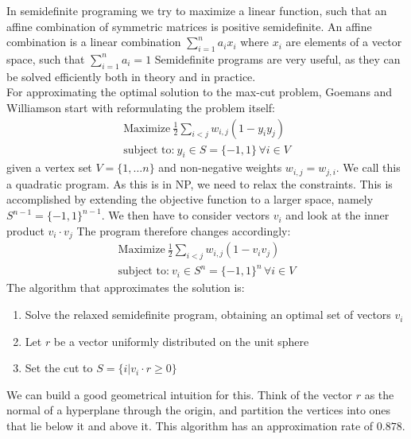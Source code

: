 In semidefinite programing we try to maximize a linear function, such that an affine combination of symmetric matrices is positive semidefinite. \cite{vandenberghe96}
An affine combination is a linear combination $\sum_{i=1}^{n}a_ix_i$
 where $x_i$ are elements of a vector space, such that $\sum_{i=1}^{n}a_i=1$
Semidefinite programs are very useful, as they can be solved efficiently both in theory and in practice.\\
For approximating the optimal solution to the max-cut problem, Goemans and Williamson \cite{goemans95} start with reformulating the problem itself: \begin{align*}
	\text{Maximize}\ \frac{1}{2}\sum_{i<j} w_{i,j}\left( 1-y_iy_j \right) \\
	\text{subject to:}\ y_i \in S=\{-1,1\}\, \forall i \in V
\end{align*}
given a vertex set $ V=\{1,\ldots n\} $ and non-negative weights $w_{i,j}=w_{j,i}$.
We call this a quadratic program.
As this is in NP, we need to relax the constraints.
This is accomplished by extending the objective function to a larger space, namely $S^{n-1}= \{-1,1\}^{n-1}$.
We then have to consider vectors $v_i$ and look at the inner product  $v_i\cdot v_j$
The program therefore changes accordingly:
 \begin{align*}
	\label{eq:}
	\text{Maximize}\ \frac{1}{2}\sum_{i<j} w_{i,j}\left( 1-v_iv_j \right) \\
	\text{subject to:}\ v_i \in S^n=\{-1,1\}^n\, \forall i \in V
\end{align*}
The algorithm that approximates the solution is:
\begin{enumerate}
	\item Solve the relaxed semidefinite program, obtaining an optimal set of vectors $v_i$
	\item Let $r$ be a vector uniformly distributed on the unit sphere
	\item Set the cut to $S=\{i|v_i\cdot r \ge 0\} $
\end{enumerate}
We can build a good geometrical intuition for this.
Think of the vector $r$ as the normal of a hyperplane through the origin, and partition the vertices into ones that lie below it and above it.
This algorithm has an approximation rate of $0.878$.
